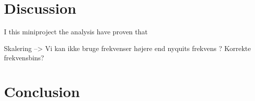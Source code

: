 

\section{Discussion}

I this miniproject the analysis have proven that 

Skalering --> Vi kan ikke bruge frekvenser højere end nyquits frekvens ?
Korrekte frekvensbins?

\section{Conclusion}